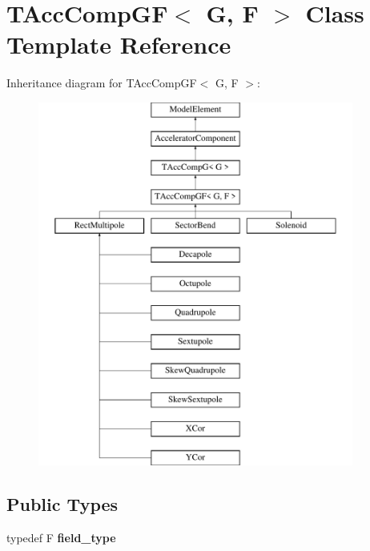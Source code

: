 \hypertarget{classTAccCompGF}{}\section{T\+Acc\+Comp\+GF$<$ G, F $>$ Class Template Reference}
\label{classTAccCompGF}
Inheritance diagram for T\+Acc\+Comp\+GF$<$ G, F $>$\+:\begin{figure}[H]
\begin{center}
\leavevmode
\includegraphics[height=12.000000cm]{classTAccCompGF}
\end{center}
\end{figure}
\subsection*{Public Types}
\begin{DoxyCompactItemize}
\item 
\mbox{\label{classTAccCompGF_a30c5576178fd1097a6237fa7d7f82f07}} 
typedef F {\bfseries field\+\_\+type}
\end{DoxyCompactItemize}
